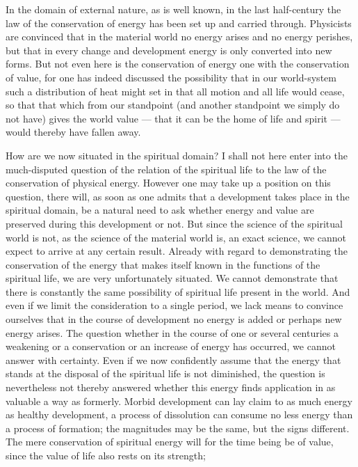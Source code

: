 \documentclass[12pt,a4paper,openany]{book}
\newcommand{\opage}[1]{\marginnote{\footnotesize\textit{[#1]}}}
\begin{document}
In the domain of external nature, as is well known, in
the last half-century the law of the conservation of energy
has been set up and carried through. Physicists are convinced that in
the material world no energy arises and no energy
perishes, but that in every change and
development energy is only converted into new forms. But not even here is
the conservation of energy one with the conservation of value, for one has
indeed discussed the possibility that in our world-system
such a distribution of heat might set in that all motion
and all life would cease, so that that which from our standpoint
(and another standpoint we simply do not have) gives the world
value --- that it can be the home of life and spirit
--- would thereby have fallen away.

\opage{227}How are we now situated in the spiritual domain?
I shall not here enter into the much-disputed
question of the relation of the spiritual life to the law of the
conservation of physical energy. However one may take up a position on
this question, there will, as soon as one admits that
a development takes place in the spiritual domain, be
a natural need to ask whether energy and value
are preserved during this development or not. But since
the science of the spiritual world is not, as
the science of the material world is, an exact science,
we cannot expect to arrive at any certain result.
Already with regard to demonstrating the conservation of
the energy that makes itself known in the functions of the spiritual life,
we are very unfortunately situated. We cannot demonstrate that
there is constantly the same possibility of spiritual life present in
the world. And even if we limit the consideration to a single
period, we lack means to convince ourselves that in
the course of development no energy is added or perhaps
new energy arises. The question whether in the course of one or
several centuries a weakening or a conservation
or an increase of energy has occurred, we cannot answer with certainty.
Even if we now confidently assume that the energy
that stands at the disposal of the spiritual life is not diminished,
the question is nevertheless not thereby answered whether this
energy finds application in as valuable a way as
formerly. Morbid development can lay claim to as
much energy as healthy development, a process of dissolution can
consume no less energy than a process of formation;
the magnitudes may be the same, but the signs different.
The mere conservation of spiritual energy will for the time being
be of value, since the value of life also rests on its strength;
\end{document}
